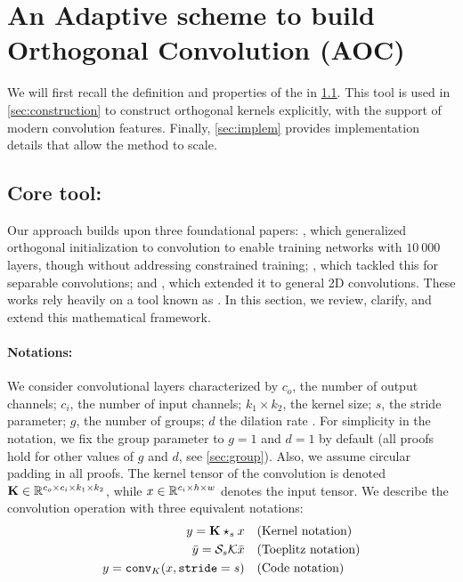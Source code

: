     
\section{An Adaptive scheme to build Orthogonal Convolution (AOC)}\label{sec:AOC}

We will first recall the definition and properties of the \Bconv{} in \cref{sec:fusing_kernel}. 
This tool is used in \cref{sec:construction} to construct orthogonal kernels explicitly, with the support of modern convolution features. 
Finally, \cref{sec:implem} provides implementation details that allow the method to scale. 

\subsection{Core tool: \Bconv}\label{sec:fusing_kernel}

Our approach builds upon three foundational papers: \cite{xiao_dynamical_2018}, which generalized orthogonal initialization to convolution to enable training networks with $10~000$ layers, though without addressing constrained training; \cite{su_scaling-up_2021}, which tackled this for separable convolutions; and \cite{li_preventing_2019}, which extended it to general 2D convolutions. These works rely heavily on a tool known as \Bconv. In this section, we review, clarify, and extend this mathematical framework.

\paragraph{Notations:}  
We consider convolutional layers characterized by $c_o$, the number of output channels; $c_i$, the number of input channels; $k_1 \times k_2$, the kernel size; $s$, the stride parameter;  $g$, the number of groups; $d$ the dilation rate . For simplicity in the notation, we fix the group parameter to  $g=1$ and $d=1$ by default (all proofs hold for other values of $g$ and $d$, see \cref{sec:group}). Also, we assume circular padding in all proofs.
The kernel tensor of the convolution is denoted $\mathbf{K} \in \mathbb{R}^{c_o\times c_i\times k_1\times k_2}$, while $x \in \mathbb{R}^{c_i \times h \times w}$ denotes the input tensor. We describe the convolution operation with three equivalent notations:
\begin{align}
    y = \mathbf{K} \star_{s} x & \quad  \text{(Kernel notation)} \label{def_convker}\\
    \bar{y} = \mathcal{S}_{s} \mathcal{K} \bar{x} & \quad  \text{(Toeplitz notation)} \label{def_convtoep} \\
    y = \mathtt{conv}_{K}(x, \mathtt{stride}=s) &  \quad \text{(Code notation)} \label{def_convcode}
\end{align}

